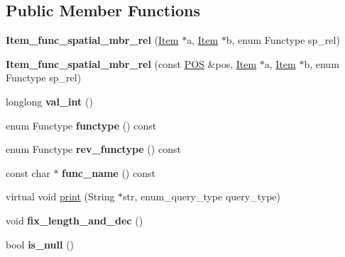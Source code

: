 \subsection*{Public Member Functions}
\begin{DoxyCompactItemize}
\item 
\mbox{\label{classItem__func__spatial__mbr__rel_a77ccc4783dce20d5df9103789c6c06d9}} 
{\bfseries Item\+\_\+func\+\_\+spatial\+\_\+mbr\+\_\+rel} (\mbox{\hyperlink{classItem}{Item}} $\ast$a, \mbox{\hyperlink{classItem}{Item}} $\ast$b, enum Functype sp\+\_\+rel)
\item 
\mbox{\label{classItem__func__spatial__mbr__rel_a8000a2ce9f01800400cd8b2eff16a881}} 
{\bfseries Item\+\_\+func\+\_\+spatial\+\_\+mbr\+\_\+rel} (const \mbox{\hyperlink{structYYLTYPE}{P\+OS}} \&pos, \mbox{\hyperlink{classItem}{Item}} $\ast$a, \mbox{\hyperlink{classItem}{Item}} $\ast$b, enum Functype sp\+\_\+rel)
\item 
\mbox{\label{classItem__func__spatial__mbr__rel_af5ccb800e8dbfeb4957aa4f037a1ede4}} 
longlong {\bfseries val\+\_\+int} ()
\item 
\mbox{\label{classItem__func__spatial__mbr__rel_ac601dcc87dc82d0c9cffdbff6662abbe}} 
enum Functype {\bfseries functype} () const
\item 
\mbox{\label{classItem__func__spatial__mbr__rel_a6e5eccd62e4bc3a10bdca2d1769c97e2}} 
enum Functype {\bfseries rev\+\_\+functype} () const
\item 
\mbox{\label{classItem__func__spatial__mbr__rel_ac3cf5a56152d343cdb2b95da42d05ec6}} 
const char $\ast$ {\bfseries func\+\_\+name} () const
\item 
virtual void \mbox{\hyperlink{classItem__func__spatial__mbr__rel_a0f37964f2e40c8cf415dd81f03795c35}{print}} (String $\ast$str, enum\+\_\+query\+\_\+type query\+\_\+type)
\item 
\mbox{\label{classItem__func__spatial__mbr__rel_a9ade0dde0d2d302bd3cf8c40f3f56f5b}} 
void {\bfseries fix\+\_\+length\+\_\+and\+\_\+dec} ()
\item 
\mbox{\label{classItem__func__spatial__mbr__rel_a472bb3fe89a2e6bbb838aeb1046f9039}} 
bool {\bfseries is\+\_\+null} ()
\end{DoxyCompactItemize}
